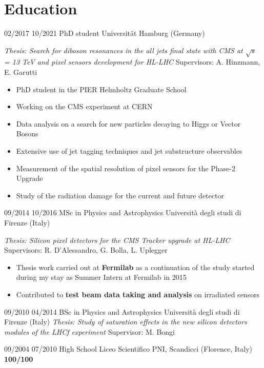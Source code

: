   \section{Education}
    \position
      {02/2017 \textemdash{} 10/2021}
      {PhD student}
      {Universit\"{a}t Hamburg (Germany)}
      {\textit{Thesis: Search for diboson resonances in the all jets final state with CMS at $\sqrt{s}$ = 13 TeV and pixel sensors development for HL-LHC} \newline  Supervisors: A. Hinzmann, E. Garutti  
      \begin{itemize}
\item PhD student in the PIER Helmholtz Graduate School
\item  Working on the CMS experiment at CERN
\item Data analysis on a search for new particles decaying to Higgs or Vector Bosons
\item Extensive use of jet tagging techniques and jet substructure observables
\item Measurement of the spatial resolution of pixel sensors for the Phase-2 Upgrade
\item Study of the radiation damage for the current and future detector
\end{itemize}}
  \position
      {09/2014 \textemdash{} 10/2016}
      {MSc in Physics and Astrophysics}
      {Universit\`a degli studi di Firenze (Italy)}
      {\textit{Thesis: Silicon pixel detectors for the CMS Tracker upgrade at HL-LHC} \newline Supervisors: R. D'Alessandro, G. Bolla, L. Uplegger  
            \begin{itemize}
\item Thesis work carried out at {\bf Fermilab} as a continuation of the study started during my stay as Summer Intern at Fermilab in 2015
\item Contributed to  {\bf test beam data taking and analysis} on irradiated sensors
\end{itemize}
 }
    \position
      {09/2010 \textemdash{} 04/2014}
      {BSc in Physics and Astrophysics}
      {Universit\`a degli studi di Firenze (Italy)}
      {\textit{Thesis:  Study of saturation effects in the new silicon detectors modules of the LHCf experiment}  \newline Supervisor: M. Bongi }
      
 \position
 {09/2004      \textemdash{} 07/2010}
 {High School}
 {Liceo Scientifico PNI, Scandicci (Florence, Italy)}
  {{\bf 100/100}}    
\fi
